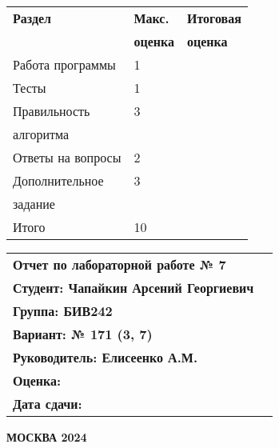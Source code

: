 \begin{titlepage}
    \begin{minipage}{0.35\textwidth}
        \begin{tabular}{|l|l|l|}
            \hline
            \textbf{Раздел} & \textbf{Макс.} & \textbf{Итоговая}\\
            & \textbf{оценка} & \textbf{оценка} \\[2ex]
            \hline
            Работа программы & 1 & \\[3ex]
            \hline
            Тесты & 1 & \\[3ex]
            \hline
            Правильность & 3 & \\
            алгоритма & & \\[3ex]
            \hline
            Ответы на вопросы & 2 & \\[3ex]
            \hline
            Дополнительное & 3 & \\
            задание & & \\[3ex]
            \hline
            Итого & 10 & \\[3ex]
            \hline
        \end{tabular}
    \end{minipage}%
    \hfill
    \begin{minipage}{0.45\textwidth}
        \begin{tabular}{lc}
            \textbf{Отчет по лабораторной работе № 7} & \\[2ex]
            \textbf{Студент: Чапайкин Арсений Георгиевич} &\\[2ex]
            \textbf{Группа: БИВ242} & \\[2ex]
            \textbf{Вариант: № 171 (3, 7)} &\\[2ex]
            \textbf{Руководитель: Елисеенко А.М.} &\\[2ex]
            \textbf{Оценка:} &\\[2ex]
            \textbf{Дата сдачи:} &\\[2ex]
        \end{tabular}
    \end{minipage}%
    \vspace*{\fill}
    \begin{center}
        \textbf{МОСКВА 2024}
    \end{center}
\end{titlepage}
